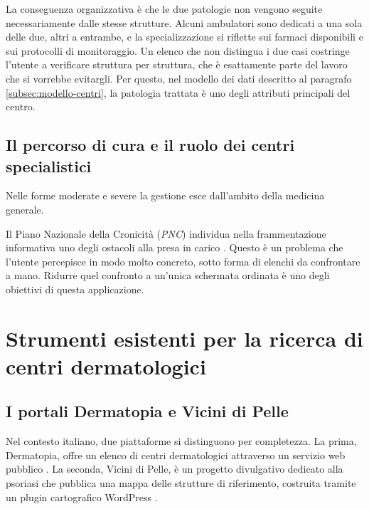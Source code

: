 La conseguenza organizzativa è che le due patologie non vengono seguite necessariamente dalle stesse strutture.
Alcuni ambulatori sono dedicati a una sola delle due, altri a entrambe, e la specializzazione si riflette sui farmaci disponibili
e sui protocolli di monitoraggio.
Un elenco che non distingua i due casi costringe l'utente a verificare struttura per struttura, che è esattamente parte del lavoro che si vorrebbe evitargli.
Per questo, nel modello dei dati descritto al paragrafo \ref{subsec:modello-centri}, la patologia trattata è uno degli attributi principali
del centro.%

\subsection{Il percorso di cura e il ruolo dei centri specialistici}\label{subsec:percorso-cura}

Nelle forme moderate e severe la gestione esce dall'ambito della medicina generale.

Il Piano Nazionale della Cronicità (\textit{PNC}) individua nella frammentazione informativa uno degli ostacoli alla presa
in carico \cite{pianoCronicita}.
Questo è un problema che l'utente percepisce in modo molto concreto, sotto forma di elenchi da confrontare a mano.
Ridurre quel confronto a un'unica schermata ordinata è uno degli obiettivi di questa applicazione.

\section{Strumenti esistenti per la ricerca di centri dermatologici}\label{sec:strumenti-esistenti}

\subsection{I portali Dermatopia e Vicini di Pelle}\label{subsec:portali-esistenti}

Nel contesto italiano, due piattaforme si distinguono per completezza.
La prima, Dermatopia, offre un elenco di centri dermatologici attraverso un servizio web pubblico \cite{dermatopia}.
La seconda, Vicini di Pelle, è un progetto divulgativo dedicato alla psoriasi che pubblica una mappa delle strutture di riferimento,
costruita tramite un plugin cartografico WordPress \cite{viciniDiPelle}.

